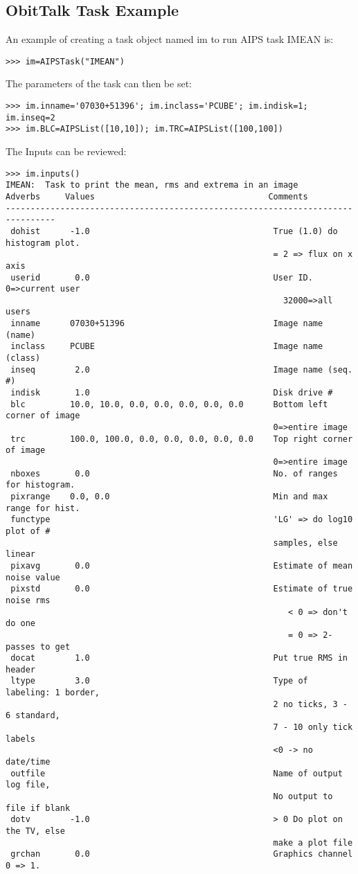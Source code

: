 \documentclass[11pt]{report}
\begin{document}
\subsection{ObitTalk Task Example}
An example of creating a task object named im to run
AIPS task IMEAN is: 
\begin{verbatim}
>>> im=AIPSTask("IMEAN")
\end{verbatim}
The parameters of the task can then be set:
\begin{verbatim}
>>> im.inname='07030+51396'; im.inclass='PCUBE'; im.indisk=1; im.inseq=2
>>> im.BLC=AIPSList([10,10]); im.TRC=AIPSList([100,100])
\end{verbatim}
The Inputs can be reviewed:
\begin{verbatim}
>>> im.inputs()
IMEAN:  Task to print the mean, rms and extrema in an image
Adverbs     Values                                   Comments
--------------------------------------------------------------------------------
 dohist      -1.0                                     True (1.0) do histogram plot.
                                                      = 2 => flux on x axis
 userid       0.0                                     User ID.  0=>current user
                                                        32000=>all users
 inname      07030+51396                              Image name (name)
 inclass     PCUBE                                    Image name (class)
 inseq        2.0                                     Image name (seq. #)
 indisk       1.0                                     Disk drive #
 blc         10.0, 10.0, 0.0, 0.0, 0.0, 0.0, 0.0      Bottom left corner of image
                                                      0=>entire image
 trc         100.0, 100.0, 0.0, 0.0, 0.0, 0.0, 0.0    Top right corner of image
                                                      0=>entire image
 nboxes       0.0                                     No. of ranges for histogram.
 pixrange    0.0, 0.0                                 Min and max range for hist.
 functype                                             'LG' => do log10 plot of #
                                                      samples, else linear
 pixavg       0.0                                     Estimate of mean noise value
 pixstd       0.0                                     Estimate of true noise rms
                                                         < 0 => don't do one
                                                         = 0 => 2-passes to get
 docat        1.0                                     Put true RMS in header
 ltype        3.0                                     Type of labeling: 1 border,
                                                      2 no ticks, 3 - 6 standard,
                                                      7 - 10 only tick labels
                                                      <0 -> no date/time
 outfile                                              Name of output log file,
                                                      No output to file if blank
 dotv        -1.0                                     > 0 Do plot on the TV, else
                                                      make a plot file
 grchan       0.0                                     Graphics channel 0 => 1.
\end{verbatim}
\end{document}
